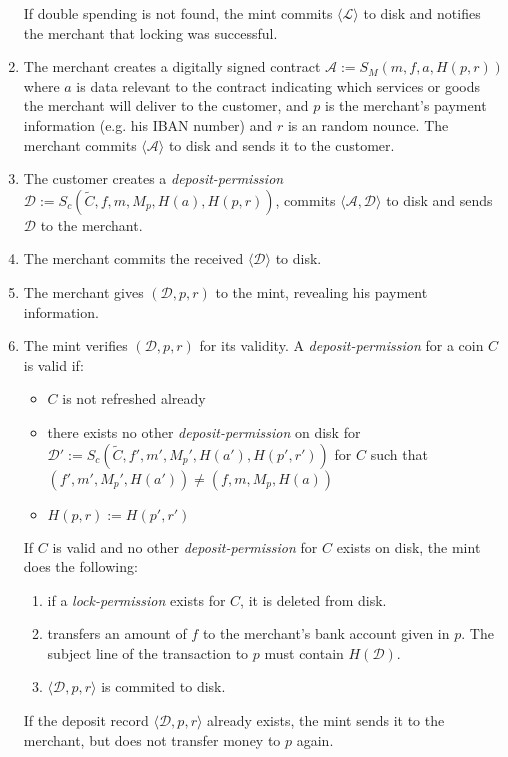 \documentclass{llncs}
\begin{document}
\begin{enumerate}
  If double spending is not found, the mint commits $\langle \mathcal{L} \rangle$ to disk
  and notifies the merchant that locking was successful.
\item\label{contract2} The merchant creates a digitally signed contract
  $\mathcal{A} := S_M(m, f, a, H(p, r))$ where $a$ is data relevant to the contract
  indicating which services or goods the merchant will deliver to the customer, and $p$ is the
  merchant's payment information (e.g. his IBAN number) and $r$ is an random nounce.
  The merchant commits $\langle \mathcal{A} \rangle$ to disk and sends it to the customer.
\item The customer creates a
  \emph{deposit-permission} $\mathcal{D} := S_c(\widetilde{C}, f, m, M_p, H(a), H(p, r))$, commits
  $\langle \mathcal{A}, \mathcal{D} \rangle$ to disk and sends $\mathcal{D}$ to the merchant.
\item\label{invoice_paid2} The merchant commits the received $\langle \mathcal{D} \rangle$ to disk.
\item The merchant gives $(\mathcal{D}, p, r)$ to the mint, revealing his
  payment information.
\item The mint verifies $(\mathcal{D}, p, r)$ for its validity.  A
  \emph{deposit-permission} for a coin $C$ is valid if:
  \begin{itemize}
  \item $C$ is not refreshed already
  \item there exists no other \emph{deposit-permission} on disk for \\
    $\mathcal{D'} := S_c(\widetilde{C}, f', m', M_p', H(a'), H(p', r'))$ for $C$
    such that \\ $(f', m',M_p', H(a')) \neq (f, m, M_p, H(a))$
  \item  $H(p, r) := H(p', r')$
  \end{itemize}
  If $C$ is valid and no other \emph{deposit-permission} for $C$ exists on disk, the
  mint does the following:
  \begin{enumerate}
    \item if a \emph{lock-permission} exists for $C$, it is deleted from disk.
    \item\label{transfer2} transfers an amount of $f$ to the merchant's bank account
      given in $p$.  The subject line of the transaction to $p$ must contain
      $H(\mathcal{D})$.
    \item $\langle \mathcal{D}, p, r \rangle$ is commited to disk.
  \end{enumerate}
  If the deposit record $\langle \mathcal{D}, p, r \rangle$ already exists,
  the mint sends it to the merchant, but does not transfer money to $p$ again.
\end{enumerate}
\end{document}
